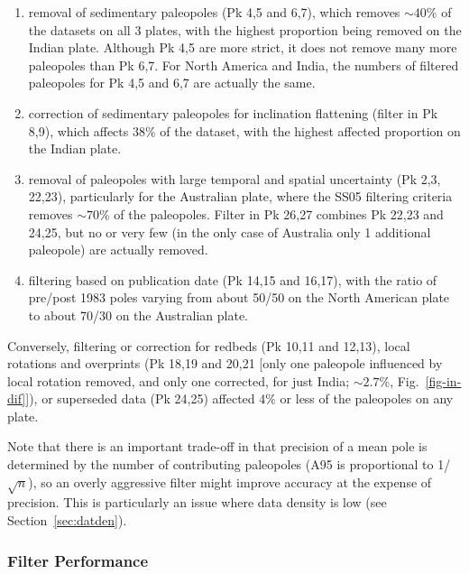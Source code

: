 \begin{enumerate}
  \item removal of sedimentary paleopoles (Pk 4,5 and 6,7), which removes
    ${\sim}40$\% of the datasets on all 3 plates, with the highest
    proportion being removed on the Indian plate. Although Pk 4,5 are more
    strict, it does not remove many more paleopoles than Pk 6,7. For North
    America and India, the numbers of filtered paleopoles for Pk 4,5 and 6,7 are
    actually the same.
  \item correction of sedimentary paleopoles for inclination flattening (filter
    in Pk 8,9), which affects 38\% of the dataset, with the highest
    affected proportion on the Indian plate.
  \item removal of paleopoles with large temporal and spatial uncertainty (Pk
    2,3, 22,23), particularly for the Australian plate, where the SS05 filtering
    criteria removes ${\sim}70$\% of the paleopoles. Filter in Pk 26,27 combines
    Pk 22,23 and 24,25, but no or very few (in the only case of Australia only 1
    additional paleopole) are actually removed.
  \item filtering based on publication date (Pk 14,15 and 16,17), with the ratio
    of pre/post 1983 poles varying from about 50/50 on the North American plate
    to about 70/30 on the Australian plate.
\end{enumerate}

Conversely, filtering or correction for redbeds (Pk 10,11 and 12,13), local
rotations and overprints (Pk 18,19 and 20,21 [only one paleopole influenced by
local rotation removed, and only one corrected, for just India; ${\sim}2.7$\%,
Fig.~\ref{fig-in-dif}]), or superseded data (Pk 24,25) affected 4\% or less of
the paleopoles on any plate.

Note that there is an important trade-off in that precision of a mean pole is
determined by the number of contributing paleopoles (A95 is proportional to
1/$\sqrt{n}$), so an overly aggressive filter might improve accuracy at the
expense of precision. This is particularly an issue where data density is low
(see Section~\ref{sec:datden}).

\subsubsection{Filter Performance}

